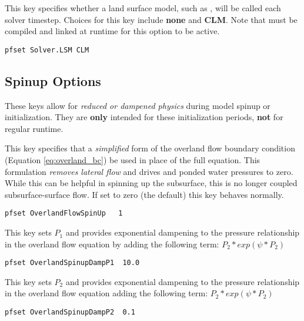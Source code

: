 {This key specifies whether a land surface model, such as , will be called each solver timestep.
Choices for this key include {\bf none} and {\bf CLM}. Note that  must be compiled and linked at runtime for this option to be active.
}
\begin{display}\begin{verbatim}
pfset Solver.LSM CLM
\end{verbatim}\end{display}


\subsection{Spinup Options}
\label{Spinup Options}

These keys allow for \emph{reduced or dampened physics} during model spinup or initialization. They are {\bf only} intended
for these initialization periods, {\bf not} for regular runtime. 

{This key specifies that a \emph{simplified} form of the overland flow boundary condition (Equation \ref{eq:overland_bc}) be used in place of the full equation.
This formulation \emph{removes lateral flow} and drives and ponded water pressures to zero.  While this can be helpful in spinning up the subsurface,
this is no longer coupled subsurface-surface flow.  If set to zero (the default) this key behaves normally. 
}
\begin{display}\begin{verbatim}
pfset OverlandFlowSpinUp   1
\end{verbatim}\end{display}

{This key sets $P_1$ and provides exponential dampening to the pressure relationship in the overland flow equation by adding the 
following term: $P_2*exp(\psi*P_2)$}
\begin{display}\begin{verbatim}
pfset OverlandSpinupDampP1  10.0
\end{verbatim}\end{display}

{This key sets $P_2$ and provides exponential dampening to the pressure relationship in the overland flow equation adding the 
following term: $P_2*exp(\psi*P_2)$ }
\begin{display}\begin{verbatim}
pfset OverlandSpinupDampP2  0.1
\end{verbatim}\end{display}

